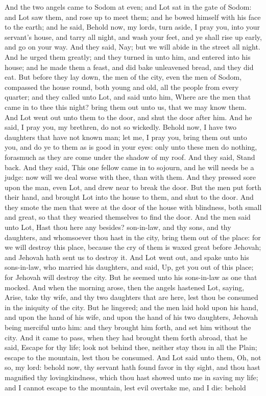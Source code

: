 And the two angels came to Sodom at even; and Lot sat in the gate of Sodom: and Lot saw them, and rose up to meet them; and he bowed himself with his face to the earth; and he said, Behold now, my lords, turn aside, I pray you, into your servant’s house, and tarry all night, and wash your feet, and ye shall rise up early, and go on your way. And they said, Nay; but we will abide in the street all night. And he urged them greatly; and they turned in unto him, and entered into his house; and he made them a feast, and did bake unleavened bread, and they did eat. But before they lay down, the men of the city, even the men of Sodom, compassed the house round, both young and old, all the people from every quarter; and they called unto Lot, and said unto him, Where are the men that came in to thee this night? bring them out unto us, that we may know them. And Lot went out unto them to the door, and shut the door after him. And he said, I pray you, my brethren, do not so wickedly. Behold now, I have two daughters that have not known man; let me, I pray you, bring them out unto you, and do ye to them as is good in your eyes: only unto these men do nothing, forasmuch as they are come under the shadow of my roof. And they said, Stand back. And they said, This one fellow came in to sojourn, and he will needs be a judge: now will we deal worse with thee, than with them. And they pressed sore upon the man, even Lot, and drew near to break the door. But the men put forth their hand, and brought Lot into the house to them, and shut to the door. And they smote the men that were at the door of the house with blindness, both small and great, so that they wearied themselves to find the door.  And the men said unto Lot, Hast thou here any besides? son-in-law, and thy sons, and thy daughters, and whomsoever thou hast in the city, bring them out of the place: for we will destroy this place, because the cry of them is waxed great before Jehovah; and Jehovah hath sent us to destroy it. And Lot went out, and spake unto his sons-in-law, who married his daughters, and said, Up, get you out of this place; for Jehovah will destroy the city. But he seemed unto his sons-in-law as one that mocked. And when the morning arose, then the angels hastened Lot, saying, Arise, take thy wife, and thy two daughters that are here, lest thou be consumed in the iniquity of the city. But he lingered; and the men laid hold upon his hand, and upon the hand of his wife, and upon the hand of his two daughters, Jehovah being merciful unto him: and they brought him forth, and set him without the city. And it came to pass, when they had brought them forth abroad, that he said, Escape for thy life; look not behind thee, neither stay thou in all the Plain; escape to the mountain, lest thou be consumed. And Lot said unto them, Oh, not so, my lord: behold now, thy servant hath found favor in thy sight, and thou hast magnified thy lovingkindness, which thou hast showed unto me in saving my life; and I cannot escape to the mountain, lest evil overtake me, and I die: behold 